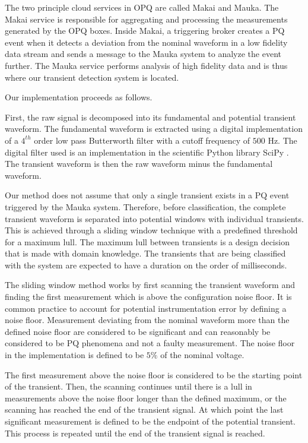 \documentclass[10pt, conference, compsocconf]{IEEEtran}
\begin{document}
The two principle cloud services in OPQ are called Makai and Mauka.  The Makai service is responsible for aggregating and processing the measurements generated by the OPQ boxes. Inside Makai, a triggering broker creates a PQ event when it detects a deviation from the nominal waveform in a low fidelity data stream and sends a message to the Mauka system to analyze the event further. The Mauka service performs analysis of high fidelity data and is thus where our transient detection system is located.

Our implementation proceeds as follows.

First, the raw signal is decomposed into its fundamental and potential transient waveform. The fundamental waveform is extracted using a digital implementation of a $4^{th}$ order low pass Butterworth filter with a cutoff frequency of $500$ Hz. The digital filter used is an implementation in the scientific Python library SciPy \cite{scipy:2019}. The transient waveform is then the raw waveform minus the fundamental waveform.

Our method does not assume that only a single transient exists in a PQ event triggered by the Mauka system. Therefore, before classification, the complete transient waveform is separated into potential windows with individual transients. This is achieved through a sliding window technique with a predefined threshold for a maximum lull. The maximum lull between transients is a design decision that is made with domain knowledge. The transients that are being classified with the system are expected to have a duration on the order of milliseconds.

The sliding window method works by first scanning the transient waveform and finding the first measurement which is above the configuration noise floor. It is common practice to account for potential instrumentation error by defining a noise floor. Measurement deviating from the nominal waveform more than the defined noise floor are considered to be significant and can reasonably be considered to be PQ phenomena and not a faulty measurement. The noise floor in the implementation is defined to be $5\%$ of the nominal voltage.

The first measurement above the noise floor is considered to be the starting point of the transient. Then, the scanning continues until there is a lull in measurements above the noise floor longer than the defined maximum, or the scanning has reached the end of the transient signal. At which point the last significant measurement is defined to be the endpoint of the potential transient. This process is repeated until the end of the transient signal is reached.
\end{document}
